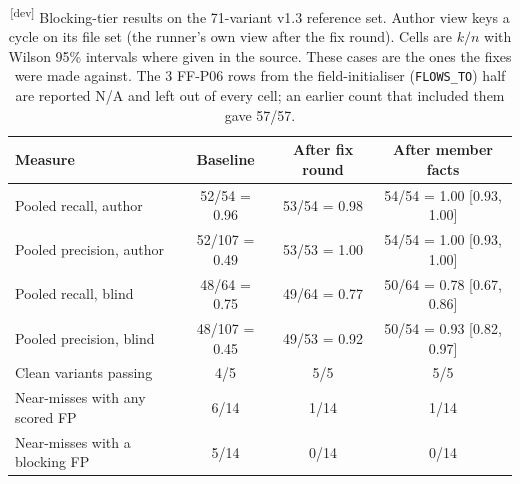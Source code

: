 \documentclass[10pt,a4paper]{article}
\newcommand{\devset}{\textsuperscript{\textsf{\tiny[dev]}}}
\newcommand{\edge}[1]{\texttt{\small #1}}
\begin{document}
\begin{table}[t]
\centering\small
\caption{\devset{} Blocking-tier results on the 71-variant v1.3 reference set. Author view keys a cycle on its file
set (the runner's own view after the fix round). Cells are $k/n$ with Wilson 95\% intervals where given in the
source. These cases are the ones the fixes were made against. The 3 FF-P06 rows from the field-initialiser
(\edge{FLOWS\_TO}) half are reported N/A and left out of every cell; an earlier count that included them gave 57/57.}
\label{tab:v13-devset}
\begin{tabular}{lccc}
\toprule
Measure & Baseline & After fix round & After member facts \\
\midrule
Pooled recall, author & 52/54 = 0.96 & 53/54 = 0.98 & 54/54 = 1.00 [0.93, 1.00] \\
Pooled precision, author & 52/107 = 0.49 & 53/53 = 1.00 & 54/54 = 1.00 [0.93, 1.00] \\
Pooled recall, blind & 48/64 = 0.75 & 49/64 = 0.77 & 50/64 = 0.78 [0.67, 0.86] \\
Pooled precision, blind & 48/107 = 0.45 & 49/53 = 0.92 & 50/54 = 0.93 [0.82, 0.97] \\
Clean variants passing & 4/5 & 5/5 & 5/5 \\
Near-misses with any scored FP & 6/14 & 1/14 & 1/14 \\
Near-misses with a blocking FP & 5/14 & 0/14 & 0/14 \\
\bottomrule
\end{tabular}
\end{table}
\end{document}
